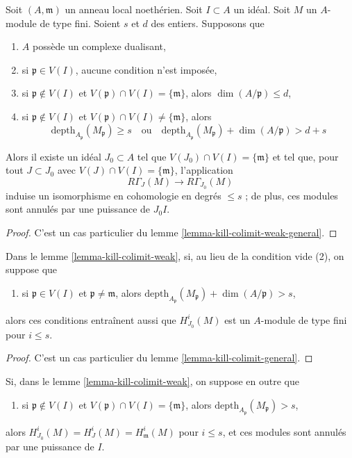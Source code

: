\begin{lemma}
\label{lemma-kill-colimit-weak}
Soit $(A, \mathfrak m)$ un anneau local noethérien.
Soit $I \subset A$ un idéal. Soit $M$ un $A$-module de type fini.
Soient $s$ et $d$ des entiers. Supposons que
\begin{enumerate}
\item $A$ possède un complexe dualisant,
\item si $\mathfrak p \in V(I)$, aucune condition n'est imposée,
\item si $\mathfrak p \not \in V(I)$ et
$V(\mathfrak p) \cap V(I) = \{\mathfrak m\}$, alors
$\dim(A/\mathfrak p) \leq d$,
\item si $\mathfrak p \not \in V(I)$ et
$V(\mathfrak p) \cap V(I) \not = \{\mathfrak m\}$, alors
$$
\text{depth}_{A_\mathfrak p}(M_\mathfrak p) \geq s
\quad\text{ou}\quad
\text{depth}_{A_\mathfrak p}(M_\mathfrak p) + \dim(A/\mathfrak p) > d + s
$$
\end{enumerate}
Alors il existe un idéal $J_0 \subset A$ tel que
$V(J_0) \cap V(I) = \{\mathfrak m\}$ et tel que, pour tout $J \subset J_0$ avec
$V(J) \cap V(I) = \{\mathfrak m\}$, l'application
$$
R\Gamma_J(M) \longrightarrow R\Gamma_{J_0}(M)
$$
induise un isomorphisme en cohomologie en degrés $\leq s$ ;
de plus, ces modules sont annulés par une puissance de $J_0I$.
\end{lemma}

\begin{proof}
C'est un cas particulier du lemme \ref{lemma-kill-colimit-weak-general}.
\end{proof}

\begin{lemma}
\label{lemma-kill-colimit}
Dans le lemme \ref{lemma-kill-colimit-weak}, si, au lieu de la condition
vide (2), on suppose que
\begin{enumerate}
\item[(2')] si $\mathfrak p \in V(I)$ et $\mathfrak p \not = \mathfrak m$,
alors $\text{depth}_{A_\mathfrak p}(M_\mathfrak p) + \dim(A/\mathfrak p) > s$,
\end{enumerate}
alors ces conditions entraînent aussi que $H^i_{J_0}(M)$ est un
$A$-module de type fini pour $i \leq s$.
\end{lemma}

\begin{proof}
C'est un cas particulier du lemme \ref{lemma-kill-colimit-general}.
\end{proof}

\begin{lemma}
\label{lemma-kill-colimit-support}
Si, dans le lemme \ref{lemma-kill-colimit-weak}, on suppose en outre que
\begin{enumerate}
\item[(6)] si $\mathfrak p \not \in V(I)$ et
$V(\mathfrak p) \cap V(I) = \{\mathfrak m\}$, alors
$\text{depth}_{A_\mathfrak p}(M_\mathfrak p) > s$,
\end{enumerate}
alors $H^i_{J_0}(M) = H^i_J(M) = H^i_\mathfrak m(M)$ pour $i \leq s$,
et ces modules sont annulés par une puissance de $I$.
\end{lemma}

